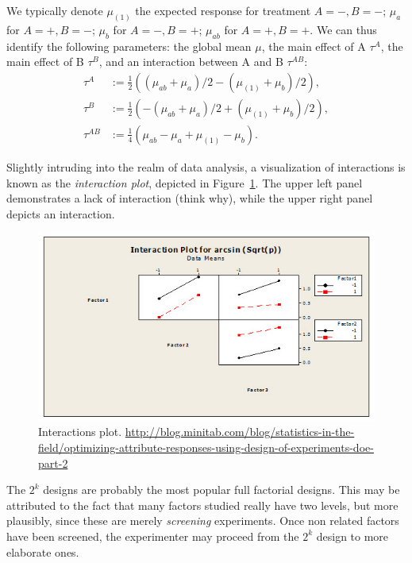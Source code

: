 We typically denote $\mu_{(1)}$ the expected response for treatment $A=-,B=-$; 
$\mu_a$ for $A=+,B=-$;
$\mu_b$ for $A=-,B=+$;
$\mu_{ab}$ for $A=+,B=+$.
We can thus identify the following parameters:
the global mean $\mu$, the main effect of A $\tau^A$, the main effect of B $\tau^B$, and an interaction between A and B $\tau^{AB}$:
\begin{align}
	\tau^A &:= \frac{1}{2}\left( (\mu_{ab}+\mu_a)/2- (\mu_{(1)}+\mu_b)/2\right), \\
	\tau^B &:= \frac{1}{2}\left( -(\mu_{ab}+\mu_a)/2 +  (\mu_{(1)}+\mu_b)/2\right), \\
	\tau^{AB} &:= \frac{1}{4}\left( \mu_{ab} - \mu_a +  \mu_{(1)} - \mu_b \right).	
\end{align}




Slightly intruding into the realm of data analysis, a visualization of interactions is known as the \emph{interaction plot}, depicted in Figure~\ref{fig:interaction_plot}. 
The upper left panel demonstrates a lack of interaction (think why), while the upper right panel depicts an interaction.
\begin{figure}[ht]
\centering
\includegraphics[width=0.3\textheight]{art/attribute_doe_interaction_plot}
\caption[Interactions plot]{Interactions plot. \newline \url{http://blog.minitab.com/blog/statistics-in-the-field/optimizing-attribute-responses-using-design-of-experiments-doe-part-2}}
\label{fig:interaction_plot}
\end{figure}


\begin{remark}
The $2^k$ designs are probably the most popular full factorial designs. 
This may be attributed to the fact that many factors studied really have two levels, but more plausibly, since these are merely \emph{screening} experiments. 
Once non related factors have been screened, the experimenter may proceed from the $2^k$ design to more elaborate ones. 
\end{remark}



